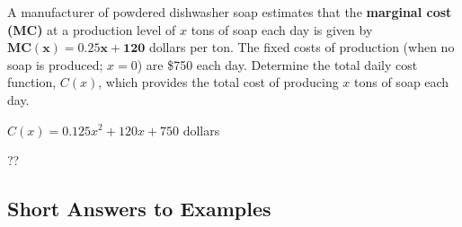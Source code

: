 \newpage
\begin{example}
A manufacturer of powdered dishwasher soap estimates that the \textbf{marginal cost (MC)} at a production level of $x$ tons of soap each day is given by $\bm{MC(x)=0.25x+120}$ dollars per ton.  The fixed costs of production (when no soap is produced; $x=0$) are \$750 each day.  Determine the total daily cost function, $C(x)$, which provides the total cost of producing $x$ tons of soap each day.
    \begin{sol}
     $C(x)=0.125x^2+120x+750$ dollars
    \end{sol}
    \begin{solL}
    ??
    
    \end{solL}
    
\end{example}






\vspace*{\fill}

\subsection*{Short Answers to Examples}

%


